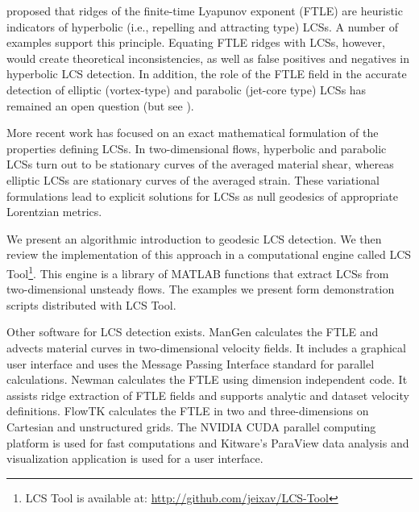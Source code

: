 \documentclass{article}
\begin{document}
\begin{sloppypar}
\textcite{haller01:_distin} proposed that ridges of the finite-time Lyapunov exponent (FTLE) are heuristic indicators of hyperbolic (i.e., repelling and attracting type) LCSs.
A number of examples support this principle\parencite{peacock13:_lagran}.
Equating FTLE ridges with LCSs, however, would create theoretical inconsistencies, as well as false positives and negatives in hyperbolic LCS detection\parencite{haller11:_lagran_coher_struc,norgard12:_secon_lagran_coher_struc}.
In addition, the role of the FTLE field in the accurate detection of elliptic (vortex-type) and parabolic (jet-core type) LCSs has remained an open question (but see \textcite{beron-vera10:_invar_lagran}).
\end{sloppypar}

More recent work has focused on an exact mathematical formulation of the properties defining LCSs\parencite{haller11:_lagran_coher_struc,farazmand12:_comput_lagran,haller12:_geodes_theor_trans_barrier_two_dimen_flows,haller13:_coher_lagran,haller14:_adden_coher_lagran,farazmand13:_attrac_lagran,blazevski14:_hyper_ellip_trans_barrier_three}.
In two-dimensional flows, hyperbolic and parabolic LCSs turn out to be stationary curves of the averaged material shear\parencite{farazmand14:_shearless}, whereas elliptic LCSs are stationary curves of the averaged strain\parencite{haller13:_coher_lagran,haller14:_adden_coher_lagran}.
These variational formulations lead to explicit solutions for LCSs as null geodesics of appropriate Lorentzian metrics.

We present an algorithmic introduction to geodesic LCS detection.
We then review the implementation of this approach in a computational engine called LCS Tool\footnote{LCS Tool is available at: \url{http://github.com/jeixav/LCS-Tool}}.
This engine is a library of MATLAB functions that extract LCSs from two-dimensional unsteady flows. The examples we present form demonstration scripts distributed with LCS Tool.

Other software for LCS detection exists.
ManGen\parencite{lekien03:_time} calculates the FTLE and advects material curves in two-dimensional velocity fields.
It includes a graphical user interface and uses the Message Passing Interface standard for parallel calculations.
Newman\parencite{toit10:_trans} calculates the FTLE using dimension independent code.
It assists ridge extraction of FTLE fields and supports analytic and dataset velocity definitions.
FlowTK\parencite{ameli14:_devel_effic_flexib_pipel_lagran} calculates the FTLE in two and three-dimensions on Cartesian and unstructured grids.
The NVIDIA CUDA parallel computing platform is used for fast computations and Kitware's ParaView data analysis and visualization application is used for a user interface.
\end{document}
